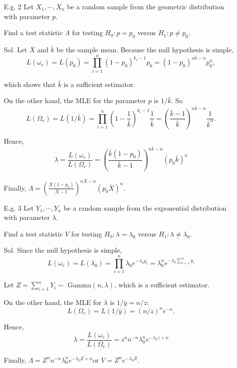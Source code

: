 \begin{frame}

	\begin{enumerate}
		\item[E.g. 2] Let $X_1,\cdots,X_n$ be a random sample from the geometric distribution with parameter $p$.
		\item[] Find a test statistic $\Lambda$ for testing
			$H_0 : p = p_0$ versus $H_1 : p \ne p_0$.
			\vfill
		\item[Sol.] Let $\overline{X}$ and $\overline{k}$ be the sample mean. Because the null hypothesis is simple,
	\[
		L(\omega_e) = L(p_0) =  \prod_{i=1}^n  (1-p_0)^{k_i-1}p_0= (1-p_0)^{n \bar{k}-n} p_0^n,
	\]
\item[] which shows that $\bar{k}$ is a sufficient estimator.
\item[] On the other hand, the MLE for the parameter $p$ is $1/\bar{k}$. So
	\[
		L(\Omega_e) = L(1/\bar{k}) = \prod_{i=1}^n \left(1-\frac{1}{\bar{k}}\right)^{k_i-1}\frac{1}{\bar{k}} = \left(\frac{\bar{k}-1}{\bar{k}}\right)^{n\bar{k}-n} \frac{1}{\bar{k}^{n}}.
	\]
\item[]	Hence,
	 \[\lambda=\frac{L(\omega_e)}{L(\Omega_e)}
	 = \left(\frac{\bar{k}(1-p_0)}{\bar{k}-1}\right)^{n\bar{k}-n} (p_0 \bar{k})^n\]
 \item[] Finally, $\Lambda= \left(\frac{\overline{X}(1-p_0)}{\overline{X}-1}\right)^{n\overline{X}-n} (p_0 \overline{X})^n$. \myEnd
	\end{enumerate}
\end{frame}
\begin{frame}

\begin{enumerate}
		\item[E.g. 3] Let $Y_1,\cdots,Y_n$ be a random sample from the exponential distribution with parameter $\lambda$.
		\item[] Find a test statistic $V$ for testing $H_0 : \lambda = \lambda_0$ versus $H_1 : \lambda \ne \lambda_0$.
			\vfill
		\item[Sol.]Since the null hypothesis is simple,
			\[
				L(\omega_e) = L(\lambda_0)  = \prod_{i=1}^n \lambda_0e^{-\lambda_0 y_i} = \lambda_0^n e^{-\lambda_0 \sum_{i=1}^n y_i}
			\]
		\item[] Let $Z=\sum_{i=1}^n Y_i\sim$ Gamma$(n,\lambda)$, which is a sufficient estimator.
		\item[] On the other hand, the MLE for $\lambda$ is $1/\bar{y}=n/z$:
			\[
				L(\Omega_e) = L(1/\bar{y}) = (n/z)^{n} e^{-n}.
			\]
	 \item[] Hence,
		 \[
			 \lambda =\frac{L(\omega_e)}{L(\Omega_e)} = z^nn^{-n} \lambda_0^n e^{-\lambda_0 z+n}
		 \]
 \item[] Finally, $\Lambda=Z^nn^{-n} \lambda_0^n e^{-\lambda_0 Z+n} $\qquad \pause or \qquad $V = Z^n e^{-\lambda_0 Z}$. \myEnd
	\end{enumerate}
\end{frame}

